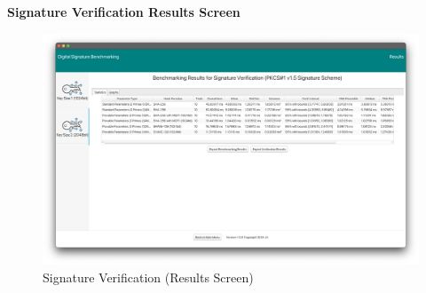 \documentclass[]{final_report}
\theoremstyle{definition}
\begin{document}

\newpage
\textbf{Signature Verification Results Screen}

\begin{figure}[H]
    \centering
    \includegraphics[scale= 0.325]{main_pictures/ui/verifying/verifying6.png}
    \caption{Signature Verification (Results Screen)}
\end{figure}
\end{document}
